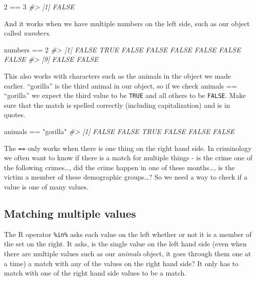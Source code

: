 \documentclass[
  12pt,
  openany]{book}
\newenvironment{Shaded}{\begin{snugshade}}{\end{snugshade}}
\newcommand{\CommentTok}[1]{\textcolor[rgb]{0.37,0.37,0.37}{\textit{#1}}}
\newcommand{\DecValTok}[1]{\textcolor[rgb]{0.06,0.06,0.06}{#1}}
\newcommand{\NormalTok}[1]{#1}
\newcommand{\SpecialCharTok}[1]{\textcolor[rgb]{0,0,0}{#1}}
\newcommand{\StringTok}[1]{\textcolor[rgb]{0.5,0.5,0.5}{#1}}
\begin{document}
\begin{Shaded}
\begin{Highlighting}[]
\DecValTok{2} \SpecialCharTok{==} \DecValTok{3}
\CommentTok{\#\textgreater{} [1] FALSE}
\end{Highlighting}
\end{Shaded}

And it works when we have multiple numbers on the left side, such as our object called \emph{numbers}.

\begin{Shaded}
\begin{Highlighting}[]
\NormalTok{numbers }\SpecialCharTok{==} \DecValTok{2}
\CommentTok{\#\textgreater{}  [1] FALSE  TRUE FALSE FALSE FALSE FALSE FALSE FALSE}
\CommentTok{\#\textgreater{}  [9] FALSE FALSE}
\end{Highlighting}
\end{Shaded}

This also works with characters such as the animals in the object we made earlier. ``gorilla'' is the third animal in our object, so if we check animals == ``gorilla'' we expect the third value to be \texttt{TRUE} and all others to be \texttt{FALSE}. Make sure that the match is spelled correctly (including capitalization) and is in quotes.

\begin{Shaded}
\begin{Highlighting}[]
\NormalTok{animals }\SpecialCharTok{==} \StringTok{"gorilla"}
\CommentTok{\#\textgreater{} [1] FALSE FALSE  TRUE FALSE FALSE FALSE}
\end{Highlighting}
\end{Shaded}

The \texttt{==} only works when there is one thing on the right hand side. In criminology we often want to know if there is a match for multiple things - is the crime one of the following crimes\ldots, did the crime happen in one of these months\ldots, is the victim a member of these demographic groups\ldots? So we need a way to check if a value is one of many values.

\hypertarget{matching-multiple-values}{%
\subsection{Matching multiple values}\label{matching-multiple-values}}

The R operator \texttt{\%in\%} asks each value on the left whether or not it is a member of the set on the right. It asks, is the single value on the left hand side (even when there are multiple values such as our \emph{animals} object, it goes through them one at a time) a match with any of the values on the right hand side? It only has to match with one of the right hand side values to be a match.
\end{document}
